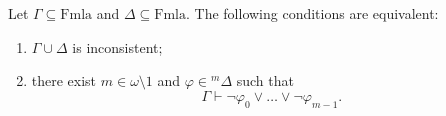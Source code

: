 Let $\Gamma \subseteq \text{Fmla}$ and $\Delta \subseteq \text{Fmla}$. The following conditions are equivalent:
\begin{enumerate}
\item[(i)] $\Gamma \cup \Delta$ is inconsistent;
\item[(ii)] there exist $m \in \omega \setminus 1$ and $\varphi \in {}^m\Delta$ such that
  $$\Gamma \vdash \neg\varphi_0 \lor \dots \lor \neg\varphi_{m-1}.$$
\end{enumerate}
